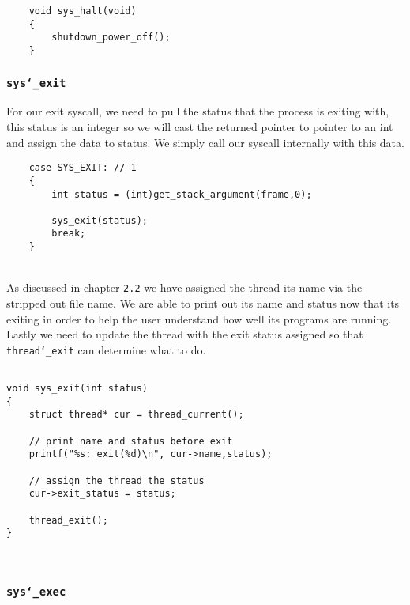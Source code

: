 \documentclass[]{article}
\begin{document}
       \lstset{language=C, tabsize=2}    
    \begin{lstlisting} 
	void sys_halt(void)
	{
		shutdown_power_off();
	}
	  \end{lstlisting}
	  \newpage
  \subsubsection{\texttt{sys\char`_exit}}
  	For our exit syscall, we need to pull the status that the process is exiting with, this status is an integer so we will cast the returned pointer to pointer to an int and assign the data to status. We simply call our syscall internally with this data.
  
	\lstset{language=C, tabsize=2}    
    \begin{lstlisting}   
	case SYS_EXIT: // 1
	{
		int status = (int)get_stack_argument(frame,0);
			
		sys_exit(status);
		break;
	}
	\end{lstlisting}
	\texttt{}\\
	As discussed in chapter \texttt{2.2} we have assigned the thread its name via the stripped out file name. We are able to print out its name and status now that its exiting in order to help the user understand how well its programs are running. Lastly we need to update the thread with the exit status assigned so that \texttt{thread\char`_exit} can determine what to do.
		\lstset{language=C, tabsize=2}    
    \begin{lstlisting}   
    
void sys_exit(int status)
{
	struct thread* cur = thread_current();

	// print name and status before exit
	printf("%s: exit(%d)\n", cur->name,status);
	
	// assign the thread the status
	cur->exit_status = status;
	
	thread_exit();
}

    
	\end{lstlisting}
	
	\newpage

		\lstset{language=C, tabsize=2}    
   
  \subsubsection{\texttt{sys\char`_exec}}
\end{document}
